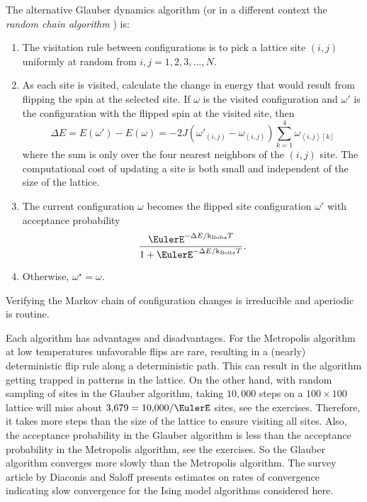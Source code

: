 \documentclass[12pt]{article}
\begin{document}
The alternative Glauber dynamics algorithm%
(or in a different context the \emph{random chain algorithm}%
%
) is:
\begin{enumerate}
    \item
        The visitation rule between configurations is to pick a lattice
        site \( (i, j) \) uniformly at random from \( i, j = 1, 2, 3,
        \dots, N \).
    \item
        As each site is visited, calculate the change in energy that
        would result from flipping the spin at the selected site.  If \(
        \omega \) is the visited configuration and \( \omega' \) is the
        configuration with the flipped spin at the visited site, then
        \[
            \Delta E = E(\omega') - E(\omega) = -2J (\omega'_{(i,j)} -
            \omega_{(i,j)}) \sum\limits_{k=1}^4\omega_{\left\langle i,j
            \right\rangle[k]}
        \] where the sum is only over the four nearest neighbors of the \(
        (i, j) \) site.  The computational cost of updating a site is
        both small and independent of the size of the lattice.
    \item
        The current configuration \( \omega \) becomes the flipped site
        configuration \( \omega' \) with acceptance probability
        \[
            \frac{\EulerE^{-\Delta E/\text{k}_{\text{Boltz}} T}}{1 +
            \EulerE^{-\Delta E/\text{k}_{\text{Boltz}} T}}.
        \]
    \item
        Otherwise, \( \omega^{\star} = \omega \).
\end{enumerate}
Verifying the Markov chain of configuration changes is irreducible and
aperiodic is routine.

Each algorithm has advantages and disadvantages.  For the Metropolis
algorithm at low temperatures unfavorable flips are rare, resulting in a
(nearly) deterministic flip rule along a deterministic path.  This can
result in the algorithm getting trapped in patterns in the lattice.  On
the other hand, with random sampling of sites in the Glauber algorithm,
taking \( 10{,}000 \) steps on a \( 100 \times 100 \) lattice will miss
about \( 3 {,}679 = 10{,}000/\EulerE \) sites, see the exercises.
Therefore, it takes more steps than the size of the lattice to ensure
visiting all sites.  Also, the acceptance probability in the Glauber
algorithm is less than the acceptance probability in the Metropolis
algorithm, see the exercises.  So the Glauber algorithm converges more
slowly than the Metropolis algorithm. The survey article by Diaconis and
Saloff
\cite{DIACONIS199820} presents estimates on rates of convergence
indicating slow convergence for the Ising model algorithms considered
here.
\end{document}
